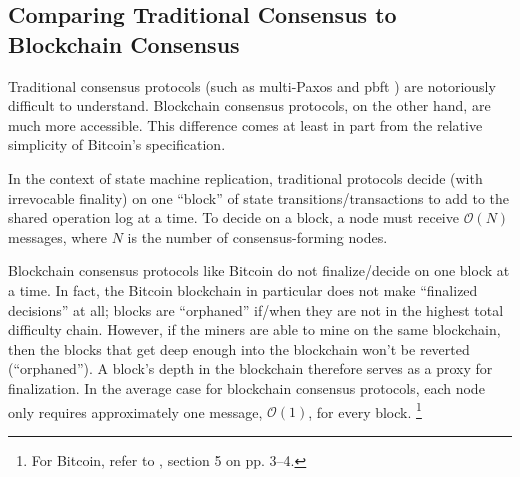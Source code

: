 \documentclass{article}
\theoremstyle{definition}
\begin{document}
\subsection{Comparing Traditional Consensus to Blockchain Consensus}

Traditional consensus protocols (such as multi-Paxos \cite{paxos} and pbft \cite{Castro_Liskov_1999_pbft}) are notoriously difficult to understand.\cite{paxos} Blockchain consensus protocols, on the other hand, are much more accessible. This difference comes at least in part from the relative simplicity of Bitcoin's specification.

In the context of state machine replication, traditional protocols decide (with irrevocable finality) on one ``block'' of state transitions/transactions to add to the shared operation log at a time.\cite{paxos} To decide on a block, a node must receive $\mathcal{O}(N)$ messages, where $N$ is the number of consensus-forming nodes.\cite{Castro_Liskov_1999_pbft}

Blockchain consensus protocols like Bitcoin do not finalize/decide on one block at a time.\cite{nakamoto} In fact, the Bitcoin blockchain in particular does not make ``finalized decisions'' at all; blocks are ``orphaned'' if/when they are not in the highest total difficulty chain. \cite{orphanBitcoin} However, if the miners are able to mine on the same blockchain, then the blocks that get deep enough into the blockchain won't be reverted (``orphaned''). A block's depth in the blockchain therefore serves as a proxy for finalization. In the average case for blockchain consensus protocols, each node only requires approximately one message, $\mathcal{O}(1)$, for every block. \footnote{For Bitcoin, refer to \cite{nakamoto}, section 5 on pp. 3–4.}
\end{document}
